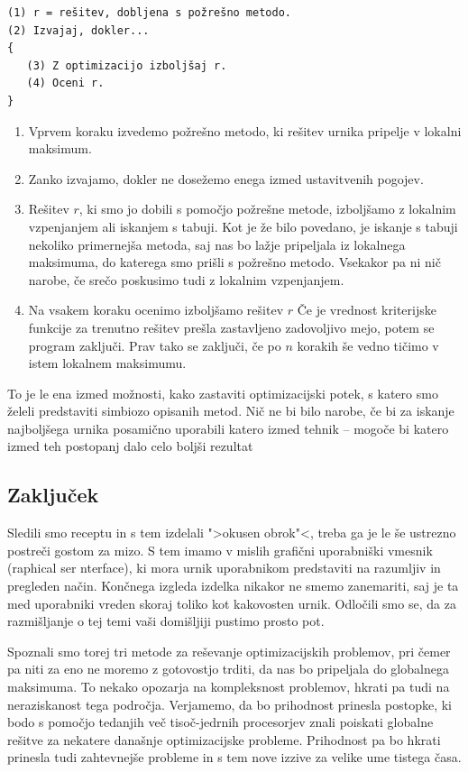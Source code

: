 \documentclass[a4paper,10pt]{article}
\begin{document}
\begin{verbatim}
(1) r = rešitev, dobljena s požrešno metodo.
(2) Izvajaj, dokler...
{
   (3) Z optimizacijo izboljšaj r.
   (4) Oceni r.
}
\end{verbatim}

   \begin{enumerate}
      \item Vprvem koraku izvedemo požrešno metodo, ki rešitev urnika pripelje v lokalni maksimum.
   
      \item Zanko izvajamo, dokler ne dosežemo enega izmed ustavitvenih pogojev.
   
      \item Rešitev \(r\), ki smo jo dobili s pomočjo požrešne metode, izboljšamo z lokalnim vzpenjanjem
      ali iskanjem s tabuji. Kot je že bilo povedano, je iskanje s tabuji nekoliko primernejša metoda,
      saj nas bo lažje pripeljala iz lokalnega maksimuma, do katerega smo prišli s požrešno metodo.
      Vsekakor pa ni nič narobe, če srečo poskusimo tudi z lokalnim vzpenjanjem.
   
      \item Na vsakem koraku ocenimo izboljšamo rešitev \(r\) Če je vrednost kriterijske funkcije
      za trenutno rešitev prešla zastavljeno zadovoljivo mejo, potem se program zaključi. Prav tako
      se zaključi, če po \(n\) korakih še vedno tičimo v istem lokalnem maksimumu.
   \end{enumerate}

\noindent
To je le ena izmed možnosti, kako zastaviti optimizacijski potek, s katero smo želeli predstaviti
simbiozo opisanih metod. Nič ne bi bilo narobe, če bi za iskanje najboljšega urnika posamično
uporabili katero izmed tehnik -- mogoče bi katero izmed teh postopanj dalo celo boljši rezultat

\subsection{Zaključek}%

Sledili smo receptu in s tem izdelali ">okusen obrok"<, treba ga je le še ustrezno postreči
gostom za mizo. S tem imamo v mislih grafični uporabniški vmesnik (raphical
ser nterface), ki mora urnik uporabnikom predstaviti na razumljiv in
pregleden način. Končnega izgleda izdelka nikakor ne smemo zanemariti, saj je ta med uporabniki
vreden skoraj toliko kot kakovosten urnik. Odločili smo se, da za razmišljanje o tej temi vaši
domišljiji pustimo prosto pot.

Spoznali smo torej tri metode za reševanje optimizacijskih problemov, pri čemer pa niti za eno
ne moremo z gotovostjo trditi, da nas bo pripeljala do globalnega maksimuma. To nekako opozarja
na kompleksnost problemov, hkrati pa tudi na neraziskanost tega področja. Verjamemo, da bo
prihodnost prinesla postopke, ki bodo s pomočjo tedanjih več tisoč-jedrnih procesorjev znali
poiskati globalne rešitve za nekatere današnje optimizacijske probleme. Prihodnost pa bo
hkrati prinesla tudi zahtevnejše probleme in s tem nove izzive za velike ume tistega časa.
\end{document}
